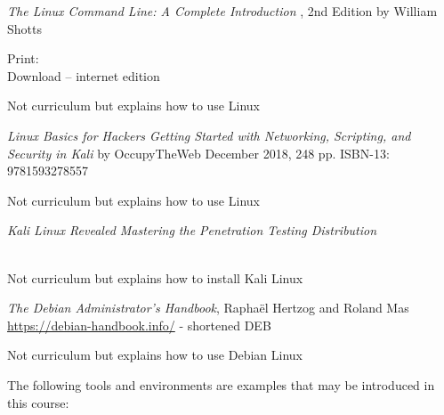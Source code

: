 \documentclass[Screen16to9,17pt]{foils}
\begin{document}
\emph{The Linux Command Line: A Complete Introduction }, 2nd Edition
by William Shotts

Print: \\
Download -- internet edition 


Not curriculum but explains how to use Linux



\emph{Linux Basics for Hackers
Getting Started with Networking, Scripting, and Security in Kali}
by OccupyTheWeb
December 2018, 248 pp.
ISBN-13:
9781593278557

Not curriculum but explains how to use Linux



\emph{Kali Linux Revealed  Mastering the Penetration Testing Distribution}

\\
Not curriculum but explains how to install Kali Linux




\emph{The Debian Administrator’s Handbook}, Raphaël Hertzog and Roland Mas\\
\url{https://debian-handbook.info/} - shortened DEB

Not curriculum but explains how to use Debian Linux






The following tools and environments are examples that may be introduced in this course:
\end{document}
